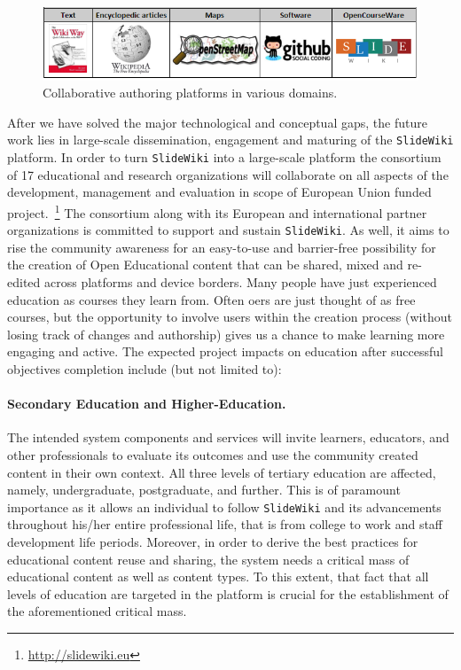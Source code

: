 \documentclass[PhD, Submit, ngerman,UKenglish,table]{scrbook}
\begin{document}
\begin{figure}
\centering
\includegraphics[width=\columnwidth]{images/filled_spot.png}
\caption{Collaborative authoring platforms in various domains.}
\label{fig:SlideWiki_place_2}
\end{figure}

After we have solved the major technological and conceptual gaps, the future work lies in large-scale dissemination, engagement and maturing of the \texttt{SlideWiki} platform. 
In order to turn \texttt{SlideWiki} into a large-scale platform the consortium of 17 educational and research organizations will collaborate on all aspects of the development, management and evaluation in scope of European Union funded project.~\footnote{\url{http://slidewiki.eu}}
The consortium along with its European and international partner organizations is committed to support and sustain \texttt{SlideWiki}.
As well, it aims to rise the community awareness for an easy-to-use and barrier-free possibility for the creation of Open Educational content that can be shared, mixed and re-edited across platforms and device borders.
Many people have just experienced education as courses they learn from. 
Often \gls{oer}s are just thought of as free courses, but the opportunity to involve users within the creation process (without losing track of changes and authorship) gives us a chance to make learning more engaging and active.
The expected project impacts on education after successful objectives completion include (but not limited to):

\paragraph{Secondary Education and Higher-Education.}
The intended system components and services will invite learners, educators, and other professionals to evaluate its outcomes and use the community created content in their own context.
All three levels of tertiary education are affected, namely, undergraduate, postgraduate, and further.
This is of paramount importance as it allows an individual to follow \texttt{SlideWiki} and its advancements throughout his/her entire professional life, that is from college to work and staff development life periods.
Moreover, in order to derive the best practices for educational content reuse and sharing, the system needs a critical mass of educational content as well as content types.
To this extent, that fact that all levels of education are targeted in the platform is crucial for the establishment of the aforementioned critical mass.
			
\end{document}
